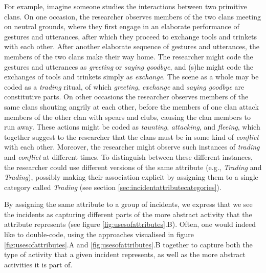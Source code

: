 \documentclass{memoir}
\begin{document}
For example, imagine someone studies the interactions between two primitive clans. On one occasion, the researcher observes members of the two clans meeting on neutral grounds, where they first engage in  an elaborate performance of gestures and utterances, after which they proceed to exchange tools and trinkets with each other. After another elaborate sequence of gestures and utterances, the members of the two clans make their way home. The researcher might code the gestures and utterances as \emph{greeting} or \emph{saying goodbye}, and (s)he might code the exchanges of tools and trinkets simply as \emph{exchange}. The scene as a whole may be coded as a \emph{trading} ritual, of which \emph{greeting}, \emph{exchange} and \emph{saying goodbye} are constitutive parts. On other occasions the researcher observes members of the same clans shouting angrily at each other, before the members of one clan attack members of the other clan with spears and clubs, causing the clan members to run away. These actions might be coded as \emph{taunting}, \emph{attacking}, and \emph{fleeing}, which together suggest to the researcher that the clans must be in some kind of \emph{conflict} with each other. Moreover, the researcher might observe such instances of \emph{trading} and \emph{conflict} at different times. To distinguish between these different instances, the researcher could use different versions of the same attribute (e.g., \emph{Trading} and \emph{Trading}), possibly making their association explicit by assigning them to a single category called \emph{Trading} (see section \ref{sec:incidentattributecategories}).

By assigning the same attribute to a group of incidents, we express that we see the incidents as capturing different parts of the more abstract activity that the attribute represents (see figure \ref{fig:usesofattributes}.B). Often, one would indeed like to double-code, using the approaches visualised in figure \ref{fig:usesofattributes}.A and \ref{fig:usesofattributes}.B together to capture both the type of activity that a given incident represents, as well as the more abstract activities it is part of. 
   
\end{document}
